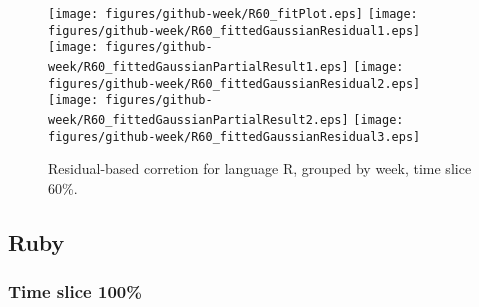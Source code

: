 \begin{figure}[hb]
\centering
{}
{\texttt{[image: figures/github-week/R60\_fitPlot.eps]}}
{\texttt{[image: figures/github-week/R60\_fittedGaussianResidual1.eps]}}
{\texttt{[image: figures/github-week/R60\_fittedGaussianPartialResult1.eps]}}
{\texttt{[image: figures/github-week/R60\_fittedGaussianResidual2.eps]}}
{\texttt{[image: figures/github-week/R60\_fittedGaussianPartialResult2.eps]}}
{\texttt{[image: figures/github-week/R60\_fittedGaussianResidual3.eps]}}
\caption{Residual-based corretion for language R, grouped by week, time slice 60\%.}
\end{figure}


\clearpage 
\newpage 


\subsection{Ruby}

\FloatBarrier

\subsubsection{Time slice 100\%}

